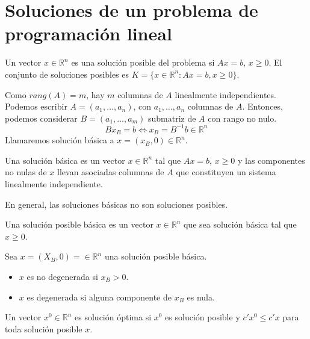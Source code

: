 \section{Soluciones de un problema de programación lineal}
\begin{definition}
    Un vector $x \in \mathbb{R}^n$ es una solución posible del problema si $Ax = b$, $x \geq 0$.
    El conjunto de soluciones posibles es $K = \{x \in \mathbb{R}^n : Ax = b, x \geq 0\}$.
\end{definition}

Como $rang(A) = m$, hay $m$ columnas de $A$ linealmente independientes.
Podemos escribir $A = (a_1, \dots, a_n)$, con $a_1, \dots, a_n$ columnas de $A$.
Entonces, podemos considerar $B = (a_1, \dots, a_m)$ submatriz de $A$ con rango no nulo.
$$Bx_B = b \Leftrightarrow x_B = B^{-1}b \in \mathbb{R}^n$$
Llamaremos solución básica a $x = (x_B, 0) \in \mathbb{R}^n$.

\begin{definition}
    Una solución básica es un vector $x \in \mathbb{R}^n$ tal que $Ax = b$, $x \geq 0$ y las componentes no nulas de $x$ llevan asociadas columnas de $A$ que constituyen un sistema linealmente independiente.
\end{definition}

\begin{remark}
    En general, las soluciones básicas no son soluciones posibles.
\end{remark}

\begin{definition}
    Una solución posible básica es un vector $x \in \mathbb{R}^n$ que sea solución básica tal que $x \geq 0$.
\end{definition}

\begin{definition}
    Sea $x = (X_B, 0) = \in \mathbb{R}^n$ una solución posible básica.
    \begin{itemize}
        \item $x$ es no degenerada si $x_B > 0$.
        \item $x$ es degenerada si alguna componente de $x_B$ es nula.
    \end{itemize}
\end{definition}

\begin{definition}
    Un vector $x^0 \in \mathbb{R}^n$ es solución óptima si $x^0$ es solución posible y $c'x^0 \leq c'x$ para toda solución posible $x$.
\end{definition}

